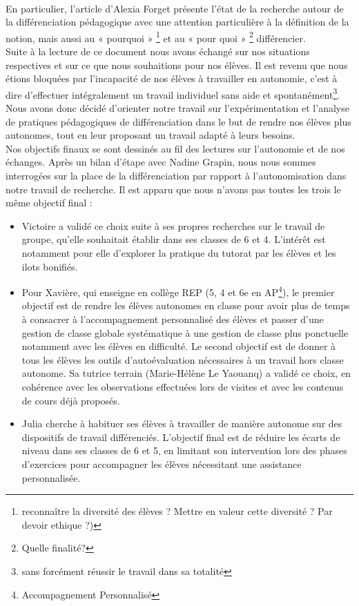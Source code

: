 \paragraph{}En particulier, l'article d'Alexia Forget\cite{cnesco_etat_lieux} présente l'état de la recherche autour de la différenciation pédagogique avec une attention particulière à la définition de la notion, mais aussi au  « pourquoi » \footnote{reconnaître la diversité des élèves ? Mettre en valeur cette diversité ? Par devoir ethique ?)} et au  « pour quoi » \footnote{Quelle finalité?} différencier.\\
Suite à la lecture de ce document nous avons échangé sur nos situations respectives et sur ce que nous souhaitions pour nos élèves. Il est revenu que nous étions bloquées par l'incapacité de nos élèves à travailler en autonomie, c'est à dire d'effectuer intégralement un travail individuel sans aide et spontanément\footnote{sans forcément réussir le travail dans sa totalité}. Nous avons donc décidé d'orienter notre travail sur l'expérimentation et l'analyse de pratiques pédagogiques de différenciation dans le but de rendre nos élèves plus autonomes, tout en leur proposant un travail adapté à leurs besoins.\\
Nos objectifs finaux se sont dessinés au fil des lectures sur l'autonomie\cite{Meirieu_autonomie}\cite{ilots_bonifies} et de nos échanges. Après un bilan d'étape avec Nadine Grapin, nous nous sommes interrogées sur la place de la différenciation par rapport à l’autonomisation dans notre travail de recherche. Il est apparu que nous n'avons pas toutes les trois le même objectif final :
\begin{itemize}
	\item Victoire a validé ce choix suite à ses propres recherches sur le travail de groupe, qu’elle souhaitait établir dans ses classes de 6 et 4. L’intérêt est notamment pour elle d’explorer la pratique du tutorat par les élèves et les ilots bonifiés.
	\item Pour Xavière, qui enseigne en collège REP (5, 4 et 6{e} en AP\footnote{Accompagnement Personnalisé}),  le premier objectif est de rendre les élèves autonomes en classe pour avoir plus de temps à consacrer à l’accompagnement personnalisé des élèves et passer d’une gestion de classe globale systématique à une gestion de classe plus ponctuelle notamment avec les élèves en difficulté. Le second objectif est de donner à tous les élèves les outils d’autoévaluation nécessaires à un travail hors classe autonome. Sa tutrice terrain (Marie-Hélène Le Yaouanq) a validé ce choix, en cohérence avec les observations effectuées lors de visites et avec les contenus de cours déjà proposés.
	\item  Julia cherche à habituer ses élèves à travailler de manière autonome sur des dispositifs de travail différenciés. L'objectif final est de réduire les écarts de niveau dans ses classes de 6 et 5, en limitant son intervention lors des phases d’exercices pour accompagner les élèves nécessitant une assistance personnalisée.
\end{itemize}
